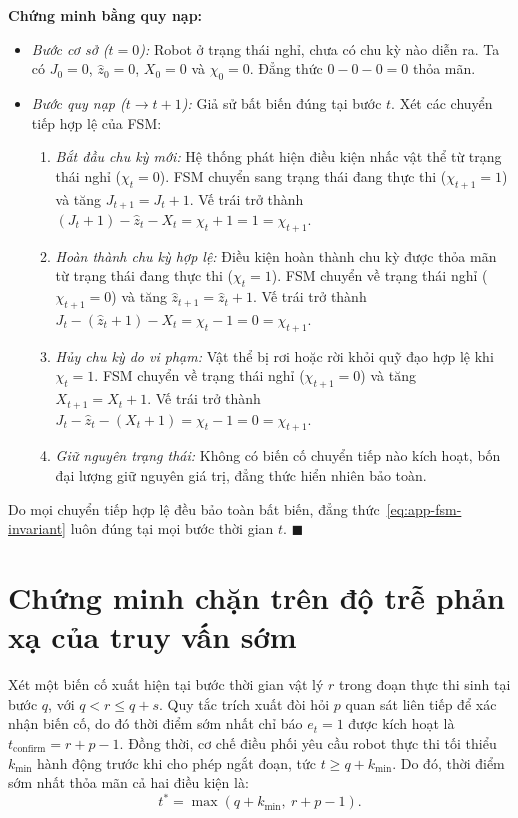 \textbf{Chứng minh bằng quy nạp:}
\begin{itemize}
\item \textit{Bước cơ sở ($t = 0$):} Robot ở trạng thái nghỉ, chưa có chu kỳ nào diễn ra. Ta có $J_0 = 0$, $\hat z_0 = 0$, $X_0 = 0$ và $\chi_0 = 0$. Đẳng thức $0 - 0 - 0 = 0$ thỏa mãn.
\item \textit{Bước quy nạp ($t \to t+1$):} Giả sử bất biến đúng tại bước $t$. Xét các chuyển tiếp hợp lệ của FSM:
  \begin{enumerate}
  \item \textit{Bắt đầu chu kỳ mới:} Hệ thống phát hiện điều kiện nhấc vật thể từ trạng thái nghỉ ($\chi_t = 0$). FSM chuyển sang trạng thái đang thực thi ($\chi_{t+1} = 1$) và tăng $J_{t+1} = J_t + 1$. Vế trái trở thành $(J_t + 1) - \hat z_t - X_t = \chi_t + 1 = 1 = \chi_{t+1}$.
  \item \textit{Hoàn thành chu kỳ hợp lệ:} Điều kiện hoàn thành chu kỳ được thỏa mãn từ trạng thái đang thực thi ($\chi_t = 1$). FSM chuyển về trạng thái nghỉ ($\chi_{t+1} = 0$) và tăng $\hat z_{t+1} = \hat z_t + 1$. Vế trái trở thành $J_t - (\hat z_t + 1) - X_t = \chi_t - 1 = 0 = \chi_{t+1}$.
  \item \textit{Hủy chu kỳ do vi phạm:} Vật thể bị rơi hoặc rời khỏi quỹ đạo hợp lệ khi $\chi_t = 1$. FSM chuyển về trạng thái nghỉ ($\chi_{t+1} = 0$) và tăng $X_{t+1} = X_t + 1$. Vế trái trở thành $J_t - \hat z_t - (X_t + 1) = \chi_t - 1 = 0 = \chi_{t+1}$.
  \item \textit{Giữ nguyên trạng thái:} Không có biến cố chuyển tiếp nào kích hoạt, bốn đại lượng giữ nguyên giá trị, đẳng thức hiển nhiên bảo toàn.
  \end{enumerate}
\end{itemize}
Do mọi chuyển tiếp hợp lệ đều bảo toàn bất biến, đẳng thức~\eqref{eq:app-fsm-invariant} luôn đúng tại mọi bước thời gian $t$. $\blacksquare$

\section{Chứng minh chặn trên độ trễ phản xạ của truy vấn sớm}
\label{sec:app-latency-proof}

Xét một biến cố xuất hiện tại bước thời gian vật lý $r$ trong đoạn thực thi sinh tại bước $q$, với $q < r \le q + s$. Quy tắc trích xuất đòi hỏi $p$ quan sát liên tiếp để xác nhận biến cố, do đó thời điểm sớm nhất chỉ báo $e_t = 1$ được kích hoạt là $t_{\mathrm{confirm}} = r + p - 1$. Đồng thời, cơ chế điều phối yêu cầu robot thực thi tối thiểu $k_{\min}$ hành động trước khi cho phép ngắt đoạn, tức $t \ge q + k_{\min}$. Do đó, thời điểm sớm nhất thỏa mãn cả hai điều kiện là:
\begin{equation}
t^* = \max(q + k_{\min},\ r + p - 1).
\end{equation}


